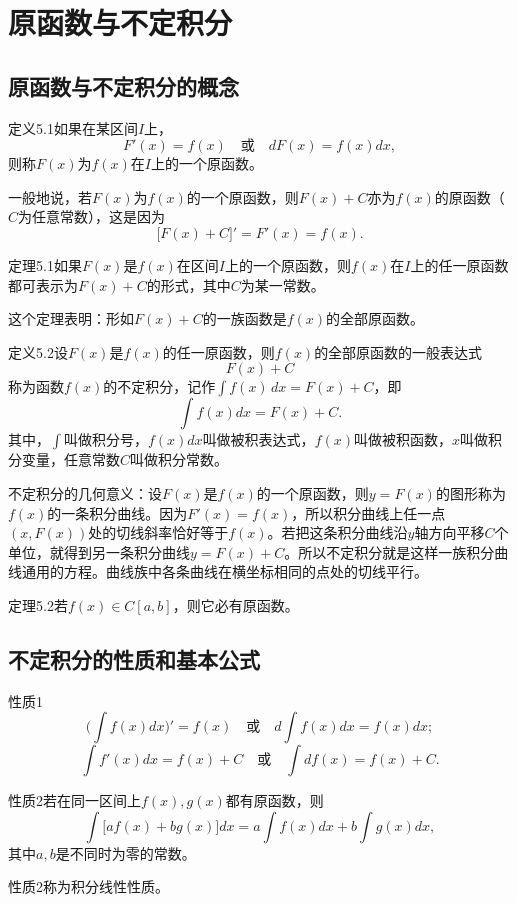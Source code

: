 
\section{原函数与不定积分}
\subsection{原函数与不定积分的概念}

定义5.1\quad 如果在某区间$I$上，
\[
F'(x)=f(x)\quad\text{或}\quad dF(x)=f(x)dx,
\]
则称$F(x)$为$f(x)$在$I$上的一个原函数。

一般地说，若$F(x)$为$f(x)$的一个原函数，则$F(x)+C$亦为$f(x)$的原函数（$C$为任意常数），这是因为
\[
\bigl[F(x)+C\bigr]'=F'(x)=f(x).
\]

定理5.1\quad 如果$F(x)$是$f(x)$在区间$I$上的一个原函数，则$f(x)$在$I$上的任一原函数都可表示为$F(x)+C$的形式，其中$C$为某一常数。

这个定理表明：形如$F(x)+C$的一族函数是$f(x)$的全部原函数。

定义5.2\quad 设$F(x)$是$f(x)$的任一原函数，则$f(x)$的全部原函数的一般表达式
\[
F(x)+C
\]
称为函数$f(x)$的不定积分，记作$\int f(x)\,dx = F(x)+C$，即
\[
\int f(x)dx=F(x)+C.
\]
其中，$\int$叫做积分号，$f(x)dx$叫做被积表达式，$f(x)$叫做被积函数，$x$叫做积分变量，任意常数$C$叫做积分常数。

不定积分的几何意义：设$F(x)$是$f(x)$的一个原函数，则$y=F(x)$的图形称为$f(x)$的一条积分曲线。因为$F'(x)=f(x)$，所以积分曲线上任一点$(x,F(x))$处的切线斜率恰好等于$f(x)$。若把这条积分曲线沿$y$轴方向平移$C$个单位，就得到另一条积分曲线$y=F(x)+C$。所以不定积分就是这样一族积分曲线通用的方程。曲线族中各条曲线在横坐标相同的点处的切线平行。

定理5.2\quad 若$f(x)\in C[a,b]$，则它必有原函数。

\subsection{不定积分的性质和基本公式}

性质1
\[
\bigl(\int f(x)dx\bigr)'=f(x)\quad\text{或}\quad d\int f(x)dx=f(x)dx;
\]
\[
\int f'(x)dx=f(x)+C\quad\text{或}\quad\int df(x)=f(x)+C.
\]

性质2\quad 若在同一区间上$f(x),g(x)$都有原函数，则
\[
\int\bigl[af(x)+bg(x)\bigr]dx=a\int f(x)dx+b\int g(x)dx,
\]
其中$a,b$是不同时为零的常数。

性质2称为积分线性性质。

